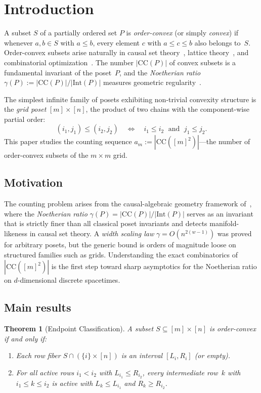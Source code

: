 \documentclass[11pt,a4paper]{article}
\theoremstyle{plain}
\newtheorem{theorem}{Theorem}[section]
\theoremstyle{definition}
\theoremstyle{remark}
\newcommand{\CC}{\mathrm{CC}}
\begin{document}
\section{Introduction}

A subset $S$ of a partially ordered set $P$ is \emph{order-convex} (or simply \emph{convex}) if whenever $a, b \in S$ with $a \leq b$, every element $c$ with $a \leq c \leq b$ also belongs to~$S$.
Order-convex subsets arise naturally in causal set theory~\cite{bombelli1987}, lattice theory~\cite{birkhoff1967}, and combinatorial optimization~\cite{dilworth1950}.
The number $|\CC(P)|$ of convex subsets is a fundamental invariant of the poset~$P$, and the \emph{Noetherian ratio} $\gamma(P) := |\CC(P)| / |\mathrm{Int}(P)|$ measures geometric regularity~\cite{difiore2026cag}.

The simplest infinite family of posets exhibiting non-trivial convexity structure is the \emph{grid poset} $[m] \times [n]$, the product of two chains with the component-wise partial order:
\[
(i_1, j_1) \leq (i_2, j_2) \quad\Longleftrightarrow\quad i_1 \leq i_2 \;\text{ and }\; j_1 \leq j_2.
\]
This paper studies the counting sequence $a_m := |\CC([m]^2)|$---the number of order-convex subsets of the $m \times m$ grid.

\subsection{Motivation}

The counting problem arises from the causal-algebraic geometry framework of~\cite{difiore2026cag}, where the \emph{Noetherian ratio} $\gamma(P) = |\CC(P)|/|\mathrm{Int}(P)|$ serves as an invariant that is strictly finer than all classical poset invariants and detects manifold-likeness in causal set theory.
A \emph{width scaling law} $\gamma = O(n^{2(w-1)})$ was proved for arbitrary posets, but the generic bound is orders of magnitude loose on structured families such as grids.
Understanding the exact combinatorics of $|\CC([m]^2)|$ is the first step toward sharp asymptotics for the Noetherian ratio on $d$-dimensional discrete spacetimes.

\subsection{Main results}

\begin{theorem}[Endpoint Classification]\label{thm:classification}
A subset $S \subseteq [m] \times [n]$ is order-convex if and only if:
\begin{enumerate}[nosep]
\item Each row fiber $S \cap (\{i\} \times [n])$ is an interval $[L_i, R_i]$ (or empty).
\item For all active rows $i_1 < i_2$ with $L_{i_1} \leq R_{i_2}$, every intermediate row~$k$ with $i_1 \leq k \leq i_2$ is active with $L_k \leq L_{i_1}$ and $R_k \geq R_{i_2}$.
\end{enumerate}
\end{theorem}
\end{document}
